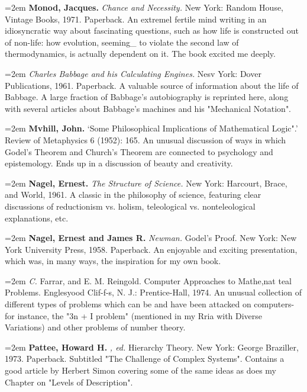 \par\noindent\hangindent=2em {\bf Monod, Jacques.} {\it Chance and Necessity.} New York: Random House, Vintage Books, 1971. Paperback. An extremel fertile mind writing in an idiosyncratic way about fascinating questions, such as how life is constructed out of non-life: how evolution, seeming\_ to violate the second law of thermodynamics, is actually dependent on it. The book excited me deeply.

\par\noindent\hangindent=2em  {\it Charles Babbage and his Calculating Engines.} Nesv York: Dover Publications, 1961. Paperback. A valuable source of information about the life of Babbage. A large fraction of Babbage's autobiography is reprinted here, along with several articles about Babbage's machines and his "Mechanical Notation".

\par\noindent\hangindent=2em {\bf Mvhill, John.} `Some Philosophical Implications of Mathematical Logic".' Review of Metaphysics 6 (1952): 165. An unusual discussion of ways in which Godel's Theorem and Church's Theorem are connected to psychology and epistemology. Ends up in a discussion of beauty and creativity.

\par\noindent\hangindent=2em {\bf Nagel, Ernest.} {\it The Structure of Science.} New York: Harcourt, Brace, and World, 1961. A classic in the philosophy of science, featuring clear discussions of reductionism vs. holism, teleological vs. nonteleological explanations, etc.

\par\noindent\hangindent=2em {\bf Nagel, Ernest and James R.} {\it Newman.} Godel's Proof. New York: New York University Press, 1958. Paperback. An enjoyable and exciting presentation, which was, in many ways, the inspiration for my own book.

\par\noindent\hangindent=2em  {\it C.} Farrar, and E. M. Reingold. Computer Approaches to Mathe,nat teal Problems. Englesyood Clif-f-s, N. J.: Prentice-Hall, 1974. An unusual collection of different types of problems which can be and have been attacked on computers-for instance, the "3n + I problem" (mentioned in my Rria with Diverse Variations) and other problems of number theory.

\par\noindent\hangindent=2em {\bf Pattee, Howard H.} {\it , ed.} Hierarchy Theory. New York: George Braziller, 1973. Paperback. Subtitled "The Challenge of Complex Systems". Contains a good article by Herbert Simon covering some of the same ideas as does my Chapter on "Levels of Description".

